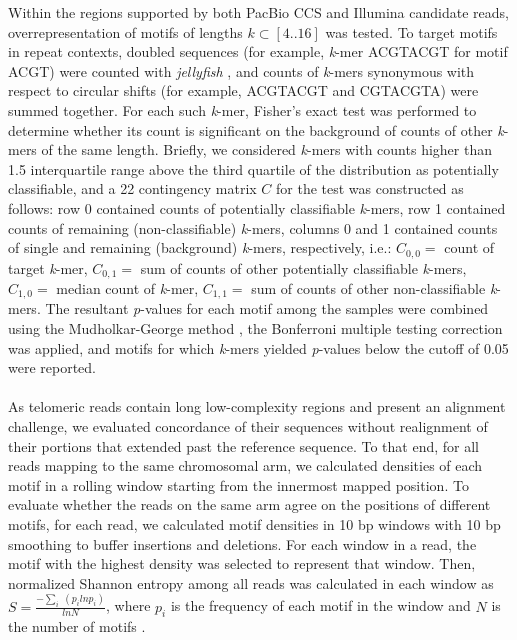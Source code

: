 \documentclass{article}
\begin{document}
Within the regions supported by both PacBio CCS and Illumina candidate reads, overrepresentation of motifs of lengths $k \subset [4 .. 16]$ was tested.
To target motifs in repeat contexts, doubled sequences (for example, \textit{k}-mer ACGTACGT for motif ACGT) were counted with \textit{jellyfish} \cite{jellyfish}, and counts of \textit{k}-mers synonymous with respect to circular shifts (for example, ACGTACGT and CGTACGTA) were summed together.
For each such \textit{k}-mer, Fisher's exact test was performed to determine whether its count is significant on the background of counts of other \textit{k}-mers of the same length.
Briefly, we considered \textit{k}-mers with counts higher than 1.5 interquartile range above the third quartile of the distribution as potentially classifiable, and a 2\texttimes{}2 contingency matrix $ C $ for the test was constructed as follows:
row 0 contained counts of potentially classifiable \textit{k}-mers,
row 1 contained counts of remaining (non-classifiable) \textit{k}-mers,
columns 0 and 1 contained counts of single and remaining (background) \textit{k}-mers, respectively,
i.e.:
$ C_{0,0} = $ {\rmfamily count of target \textit{k}-mer},
$ C_{0,1} = $ {\rmfamily sum of counts of other potentially classifiable \textit{k}-mers},
$ C_{1,0} = $ {\rmfamily median count of \textit{k}-mer},
$ C_{1,1} = $ {\rmfamily sum of counts of other non-classifiable \textit{k}-mers}.
The resultant \textit{p}-values for each motif among the samples were combined using the Mudholkar-George method \cite{george}, the Bonferroni multiple testing correction was applied, and motifs for which \textit{k}-mers yielded \textit{p}-values below the cutoff of 0.05 were reported.
\\~\\
As telomeric reads contain long low-complexity regions and present an alignment challenge, we evaluated concordance of their sequences without realignment of their portions that extended past the reference sequence.
To that end, for all reads mapping to the same chromosomal arm, we calculated densities of each motif in a rolling window starting from the innermost mapped position.
To evaluate whether the reads on the same arm agree on the positions of different motifs, for each read, we calculated motif densities in 10 bp windows with 10 bp smoothing to buffer insertions and deletions.
For each window in a read, the motif with the highest density was selected to represent that window.
Then, normalized Shannon entropy among all reads was calculated in each window as $ S = \frac{ - \sum_{i} \; ( p_{i} ln p_{i} )}{ln N} $, where $ p_{i} $ is the frequency of each motif in the window and $ N $ is the number of motifs \cite{hepc_entropy}.
\end{document}
